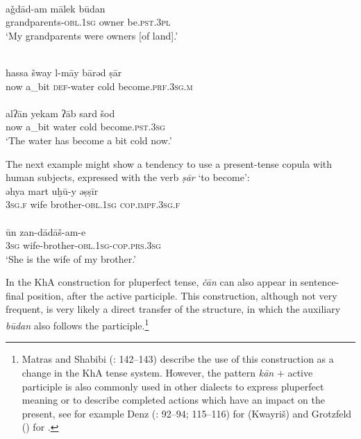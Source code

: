 \documentclass[output=paper,nonflat]{langsci/langscibook}
\begin{document}
\\
\gll aǧdād-am mālek būdan\\
     grandparents-\textsc{obl.1sg} owner be.\textsc{pst.3pl}\\
\glt ‘My grandparents were owners [of land].’
\z\z

\ea\label{cold}
\\
\gll hassa šway l-māy bārəd ṣār\\
     now a\_bit \textsc{def}{}-water cold become.\textsc{prf.3sg.m}\\
 
\\
\gll alʔān yekam ʔāb sard šod\\
     now a\_bit water cold become.\textsc{pst}.\textsc{3sg}\\
\glt ‘The water has become a bit cold now.’
\z\z

The next example might show a tendency to use a present-{tense} {copula} with human subjects, expressed with the verb \textit{ṣār} ‘to become’: 
\ea
{}\\
\gll əhya mart uḫū-y əṣṣīr\\
     3\textsc{sg.f} wife brother-\textsc{obl.1sg} \textsc{cop.impf.3sg.f}\\
 
\\
\gll ūn zan-dādāš-am-e\\
     3\textsc{sg} wife-brother-\textsc{obl.1sg}-\textsc{cop.prs.3sg}\\
\glt ‘She is the wife of my brother.’
\z\z


In the KhA construction for pluperfect {tense}, \textit{čān} can also appear in sentence-final position, after the active {participle}. This construction, although not very frequent, is very likely a direct {transfer} of the  structure, in which the auxiliary \textit{būdan} also follows the {participle}.\footnote{Matras and Shabibi (\citeyear{MatrasShabibi2007}: 142–143) describe the use of this construction as a change in the KhA {tense} system. However, the pattern \textit{kān} + active {participle} is also commonly used in other  dialects to express pluperfect meaning or to describe completed actions which have an impact on the present, see for example Denz (\citeyear{Denz1971}: 92–94; 115–116) for  (Kwayriš) and Grotzfeld (\citeyear[88]{Grotzfeld1965}) for  .} 
\end{document}
